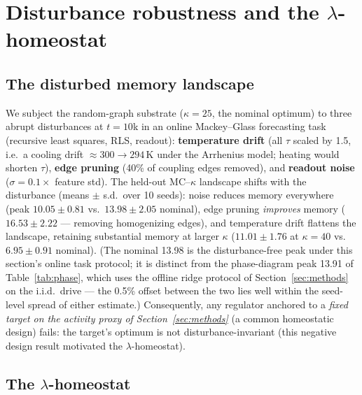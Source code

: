\documentclass[11pt]{article}
\begin{document}
\section{Disturbance robustness and the \texorpdfstring{$\lambda$}{lambda}-homeostat}
\label{sec:homeostat}

\subsection{The disturbed memory landscape}

We subject the random-graph substrate ($\kappa=25$, the nominal optimum) to
three abrupt disturbances at $t=10$k in an online Mackey--Glass forecasting
task \cite{mackeyglass1977} (recursive least squares, RLS, readout):
\textbf{temperature drift} (all $\tau$ scaled by 1.5, i.e.\ a cooling drift $\approx 300\to294$\,K under the Arrhenius model; heating would shorten $\tau$),
\textbf{edge pruning} (40\% of coupling edges removed), and \textbf{readout
noise} ($\sigma=0.1\times$ feature std). The held-out MC--$\kappa$ landscape
shifts with the disturbance (means $\pm$ s.d.\ over 10 seeds): noise reduces memory everywhere (peak $10.05\pm0.81$ vs.\
$13.98\pm2.05$ nominal), edge pruning \emph{improves} memory ($16.53\pm2.22$
--- removing
homogenizing edges), and temperature drift flattens the landscape, retaining
substantial memory at larger $\kappa$ ($11.01\pm1.76$ at $\kappa=40$ vs.\
$6.95\pm0.91$ nominal).
(The nominal 13.98 is the disturbance-free peak under this section's online
task protocol; it is distinct from the phase-diagram peak 13.91 of
Table~\ref{tab:phase}, which uses the offline ridge protocol of
Section~\ref{sec:methods} on the i.i.d.\ drive --- the 0.5\% offset between
the two lies well within the seed-level spread of either estimate.)
Consequently, any regulator anchored to a \emph{fixed target on the activity
proxy of Section~\ref{sec:methods}}
(a common homeostatic design) fails: the target's optimum is not
disturbance-invariant (this negative design result motivated the
$\lambda$-homeostat).

\subsection{The \texorpdfstring{$\lambda$}{lambda}-homeostat}
\end{document}
